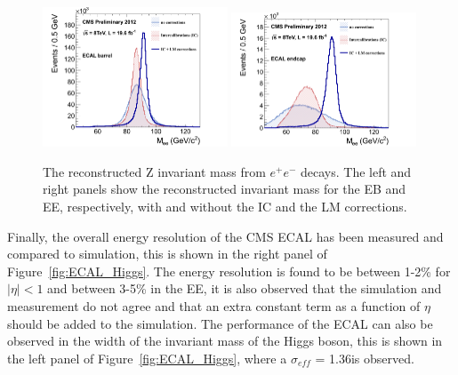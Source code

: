 \begin{figure}
 \centering
\includegraphics[width=0.49\textwidth]{CMS_DetectorFigures/noIC_noLaser-regrCorr_ele-EB.png}
\includegraphics[width=0.49\textwidth]{CMS_DetectorFigures/propaganda_noIC_noLaser-regrCorr_ele-EE.png}
\caption{The reconstructed Z invariant mass from $e^{+}e^{-}$
  decays. The left and right panels show the reconstructed invariant mass for
  the EB and EE, respectively, with and without the IC and the LM corrections.\label{fig:ECAL_E_IC_LM}}
\end{figure}
 Finally, the overall energy resolution of the CMS ECAL has been measured
 and compared to simulation, this is shown in the right panel of
 Figure~\ref{fig:ECAL_Higgs}. The energy resolution is found to be
 between 1-2\% for $|\eta|<1$ and between 3-5\% in the EE, it is also
 observed that the simulation and measurement do not agree and that an
 extra constant term as a function of $\eta$ should be added to the
 simulation. The performance of the ECAL can also be observed in the
 width of the invariant mass of the Higgs boson, this is shown in the
 left panel of Figure~\ref{fig:ECAL_Higgs}, where a $\sigma_{eff}$ =
 1.36\GeV is observed.
